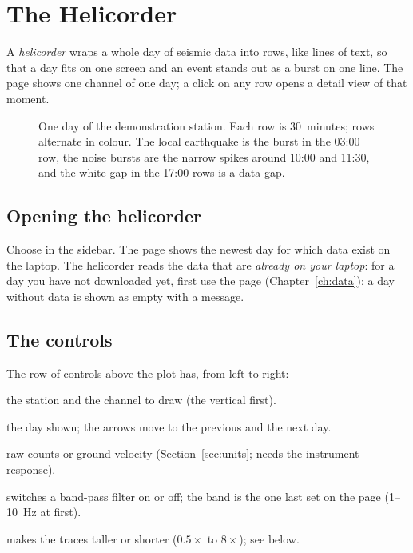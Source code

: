 \chapter{The Helicorder}\label{ch:heli}

A \emph{helicorder} wraps a whole day of seismic data into rows, like lines of text, so that a day fits on one screen and an
event stands out as a burst on one line. The  page shows one channel of one day; a click on any row opens a detail
view of that moment.

\begin{figure}[tbp]
\centering
{}
\caption{One day of the demonstration station. Each row is 30~minutes; rows alternate in colour. The local earthquake is the burst
in the 03:00 row, the noise bursts are the narrow spikes around 10:00 and 11:30, and the white gap in the 17:00 rows is a data gap.}\label{fig:heliday}
\end{figure}

\section{Opening the helicorder}
Choose  in the sidebar. The page shows the newest day for which data exist on the laptop. The helicorder reads
the data that are \emph{already on your laptop}: for a day you have not downloaded yet, first use the  page
(Chapter~\ref{ch:data}); a day without data is shown as empty with a message.

\section{The controls}
The row of controls above the plot has, from left to right:
\begin{description}[leftmargin=3.2cm,style=nextline]
\item[Station, channel] the station and the channel to draw (the vertical  first).
\item[\ \raisebox{-1pt}{$\langle$}\ date\ \raisebox{-1pt}{$\rangle$}] the day shown; the arrows move to the previous and the next day.
\item[counts / m/s] raw counts or ground velocity (Section~\ref{sec:units};  needs the instrument response).
\item[Band-pass] switches a band-pass filter on or off; the band is the one last set on the  page (1--10~Hz at first).
\item[Scale] makes the traces taller or shorter ($0.5\times$ to $8\times$); see below.
\end{description}

